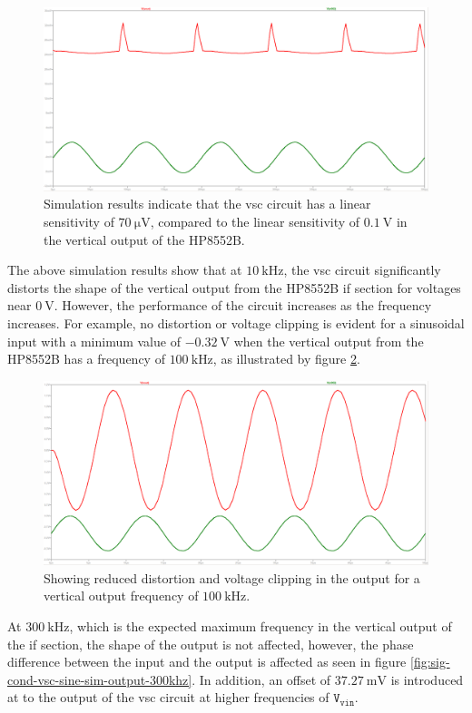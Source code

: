 \documentclass[class=report,11pt,crop=false]{standalone}
\begin{document}
	\begin{figure}[h!]
		\centering
		\includegraphics[width=0.7\linewidth]{Figures/Methodology/sig-cond-vsc-sine-sim-output-0042Vpp}
		\caption{Simulation results indicate that the \acrshort{vsc} circuit has a linear sensitivity of $\SI{70}{\micro\volt}$, compared to the linear sensitivity of $\SI{0.1}{\volt}$ in the vertical output of the HP8552B.}
		\label{fig:sig-cond-vsc-sine-sim-output-0024Vpp}
	\end{figure}  

	The above simulation results show that at $\SI{10}{\kilo\hertz}$, the \acrshort{vsc} circuit significantly distorts the shape of the vertical output from the HP8552B \acrshort{if} section for voltages near $\SI{0}{\volt}$. However, the performance of the circuit increases as the frequency increases. For example, no distortion or voltage clipping is evident for a sinusoidal input with a minimum value of $-\SI{0.32}{\volt}$ when the vertical output from the HP8552B has a frequency of $\SI{100}{\kilo\hertz}$, as illustrated by figure \ref{fig:sig-cond-vsc-sine-sim-output-100khz}.
	
	\begin{figure}[h!]
		\centering
		\includegraphics[width=0.7\linewidth]{Figures/Methodology/sig-cond-vsc-sine-sim-output-100khz}
		\caption{Showing reduced distortion and voltage clipping in the output for a vertical output frequency of $\SI{100}{\kilo\hertz}$.}
		\label{fig:sig-cond-vsc-sine-sim-output-100khz}
	\end{figure}  

	At $\SI{300}{\kilo\hertz}$, which is the expected maximum frequency in the vertical output of the \acrshort{if} section, the shape of the output is not affected, however, the phase difference between the input and the output is affected as seen in figure \ref{fig:sig-cond-vsc-sine-sim-output-300khz}. In addition, an offset of $\SI{37.27}{\milli\volt}$ is introduced at to the output of the \acrshort{vsc} circuit at higher frequencies of $\texttt{V}_\texttt{vin}$. 
	
\end{document}
